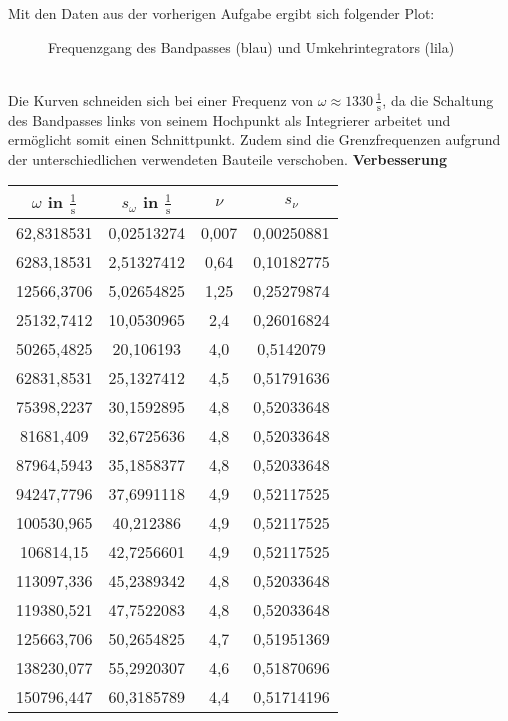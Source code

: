 Mit den Daten aus der vorherigen Aufgabe ergibt sich folgender Plot:
\begin{figure}[h]
    \centering\scalebox{1}{}
    \caption{Frequenzgang des Bandpasses (blau) und Umkehrintegrators (lila)}
\end{figure}\\
Die Kurven schneiden sich bei einer Frequenz von \(\omega \approx 1330\,\frac{1}{\text{s}}\), da die Schaltung des Bandpasses links von seinem Hochpunkt als Integrierer arbeitet und ermöglicht somit einen Schnittpunkt.
Zudem sind die Grenzfrequenzen aufgrund der unterschiedlichen verwendeten Bauteile verschoben.
\newpage
\textbf{Verbesserung}\\
\begin{table}[htbp]
    \centering
      \begin{tabular}{c|c|c|c}
        $\omega$ in $\frac{1}{\text{s}}$ & $s_\omega$ in $\frac{1}{\text{s}}$ & $\nu$ & $s_\nu$\\
        \hline
      62,8318531 & 0,02513274 & 0,007 & 0,00250881 \\
      6283,18531 & 2,51327412 & 0,64 & 0,10182775 \\
      12566,3706 & 5,02654825 & 1,25 & 0,25279874 \\
      25132,7412 & 10,0530965 & 2,4 & 0,26016824 \\
      50265,4825 & 20,106193 & 4,0 & 0,5142079 \\
      62831,8531 & 25,1327412 & 4,5 & 0,51791636 \\
      75398,2237 & 30,1592895 & 4,8 & 0,52033648 \\
      81681,409 & 32,6725636 & 4,8 & 0,52033648 \\
      87964,5943 & 35,1858377 & 4,8 & 0,52033648 \\
      94247,7796 & 37,6991118 & 4,9 & 0,52117525 \\
      100530,965 & 40,212386 & 4,9 & 0,52117525 \\
      106814,15 & 42,7256601 & 4,9 & 0,52117525 \\
      113097,336 & 45,2389342 & 4,8 & 0,52033648 \\
      119380,521 & 47,7522083 & 4,8 & 0,52033648 \\
      125663,706 & 50,2654825 & 4,7 & 0,51951369 \\
      138230,077 & 55,2920307 & 4,6 & 0,51870696 \\
      150796,447 & 60,3185789 & 4,4 & 0,51714196 \\

\end{tabular}
\end{table}
